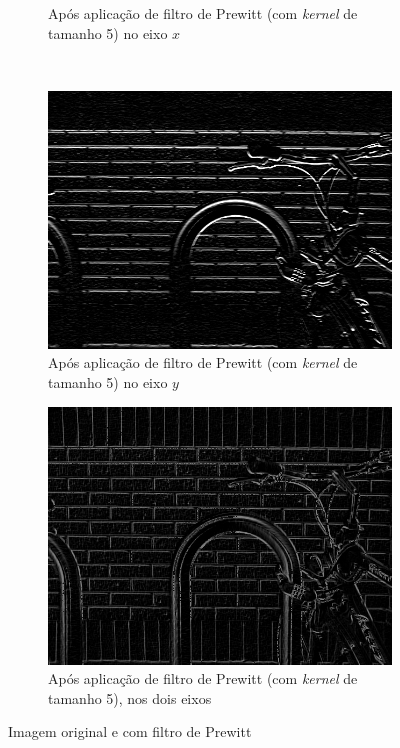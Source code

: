\documentclass[10pt,a4paper]{article}
\newcommand{\kernel}{\textit{kernel} }
\begin{document}
\begin{figure}[!ht]
\begin{subfigure}[ht]{0.45\textwidth}
        \caption{\centering Após aplicação de filtro de Prewitt (com \kernel de tamanho 5) no eixo $x$}
        \label{fig:prewitt_x}
    \end{subfigure}
    \\
    \begin{subfigure}[ht]{0.45\textwidth}
        \includegraphics[width=\textwidth]{prewitt_y.jpg}
        \caption{\centering Após aplicação de filtro de Prewitt (com \kernel de tamanho 5) no eixo $y$}
        \label{fig:prewitt_y}
    \end{subfigure}
    \qquad
    \begin{subfigure}[ht]{0.45\textwidth}
        \includegraphics[width=\textwidth]{prewitt.jpg}
        \caption{\centering Após aplicação de filtro de Prewitt (com \kernel de tamanho 5), nos dois eixos}
        \label{fig:prewitt}
    \end{subfigure}
    \caption{Imagem original e com filtro de Prewitt}
    \label{fig:prew}
\end{figure}
\end{document}
